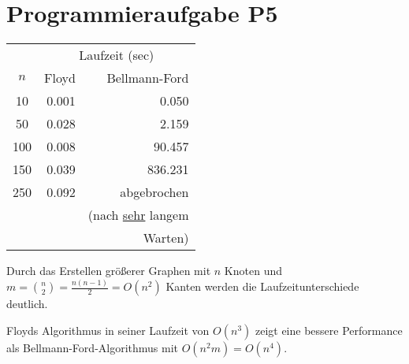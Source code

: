 \documentclass[11pt]{scrartcl} %
\begin{document}
\section*{Programmieraufgabe P5}
\begin{minipage}[h]{0.4\textwidth}
\begin{tabular}{c|r|r}
 & \multicolumn{2}{c}{Laufzeit (sec)}\\
$n$ & Floyd & Bellmann-Ford\\
\hline \hline
10 & 0.001 & 0.050\\
\hline
50 & 0.028 & 2.159 \\
\hline
100 & 0.008 & 90.457 \\
\hline
150 & 0.039 & 836.231 \\
\hline
250 & 0.092 & abgebrochen\\
& & \scriptsize{(nach \underline{sehr} langem}\\
& & \scriptsize{Warten)}\\
\hline
\end{tabular}
\end{minipage}
\begin{minipage}[h]{0.6\textwidth}
Durch das Erstellen größerer Graphen mit $n$ Knoten und $m=\binom{n}{2}=\frac{n(n-1)}{2}=O(n^2)$ Kanten werden die Laufzeitunterschiede deutlich. 

Floyds Algorithmus in seiner Laufzeit von $O(n^3)$ zeigt eine bessere Performance als Bellmann-Ford-Algorithmus mit $O(n^2m)=O(n^4)$. 
\end{minipage}
\end{document}
